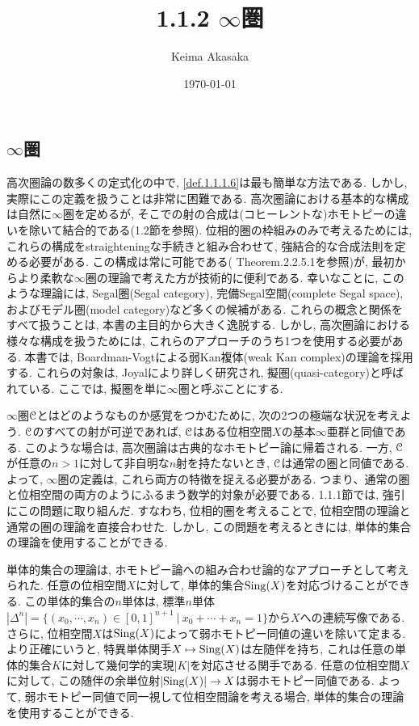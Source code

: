 \documentclass[uplatex, a4paper, 14Q, dvipdfmx]{jsreport}
\title{1.1.2 \texorpdfstring{$\infty$}{infty}圏}
\author{Keima Akasaka}
\date{\today}
\begin{document}
\maketitle

\setcounter{chapter}{1}
\setcounter{section}{1} 
\setcounter{subsection}{1}   
\setcounter{subsubsection}{1}

\subsection{\texorpdfstring{$\infty$}{infty}圏}

高次圏論の数多くの定式化の中で, \cref{def.1.1.1.6}は最も簡単な方法である. 
しかし, 実際にこの定義を扱うことは非常に困難である. 
高次圏論における基本的な構成は自然に$\infty$圏を定めるが, そこでの射の合成は(コヒーレントな)ホモトピーの違いを除いて結合的である(1.2節を参照).
位相的圏の枠組みのみで考えるためには, これらの構成をstraighteningな手続きと組み合わせて, 強結合的な合成法則を定める必要がある. 
この構成は常に可能である(\cite{HTT} Theorem.2.2.5.1を参照)が, 最初からより柔軟な$\infty$圏の理論で考えた方が技術的に便利である. 
幸いなことに, このような理論には, Segal圏(Segal category), 完備Segal空間(complete Segal space), およびモデル圏(model category)など多くの候補がある. 
これらの概念と関係をすべて扱うことは, 本書の主目的から大きく逸脱する. 
しかし, 高次圏論における様々な構成を扱うためには, これらのアプローチのうち1つを使用する必要がある. 
本書では, Boardman-Vogtによる弱Kan複体(weak Kan complex)の理論を採用する. 
これらの対象は, Joyalにより詳しく研究され, 擬圏(quasi-category)と呼ばれている. 
ここでは, 擬圏を単に$\infty$圏と呼ぶことにする. 

$\infty$圏$\mathcal{C}$とはどのようなものか感覚をつかむために, 次の2つの極端な状況を考えよう. 
$\mathcal{C}$のすべての射が可逆であれば, $\mathcal{C}$はある位相空間$X$の基本$\infty$亜群と同値である. 
このような場合は, 高次圏論は古典的なホモトピー論に帰着される. 
一方, $\mathcal{C}$が任意の$n>1$に対して非自明な$n$射を持たないとき, $\mathcal{C}$は通常の圏と同値である. 
よって, $\infty$圏の定義は, これら両方の特徴を捉える必要がある. 
つまり、通常の圏と位相空間の両方のようにふるまう数学的対象が必要である. 
1.1.1節では, 強引にこの問題に取り組んだ. 
すなわち, 位相的圏を考えることで, 位相空間の理論と通常の圏の理論を直接合わせた. 
しかし, この問題を考えるときには, 単体的集合の理論を使用することができる. 

単体的集合の理論は, ホモトピー論への組み合わせ論的なアプローチとして考えられた. 
任意の位相空間$X$に対して, 単体的集合$\mathrm{Sing}(X)$を対応づけることができる. 
この単体的集合の$n$単体は, 標準$n$単体$|\Delta^n| = \{(x_0,\cdots,x_n) \in [0,1]^{n+1} ~|~ x_0 + \cdots + x_n = 1\}$から$X$への連続写像である. 
さらに, 位相空間$X$は$\mathrm{Sing}(X)$によって弱ホモトピー同値の違いを除いて定まる. 
より正確にいうと, 特異単体関手$X \mapsto \mathrm{Sing}(X)$は左随伴を持ち, これは任意の単体的集合$K$に対して幾何学的実現$|K|$を対応させる関手である. 
任意の位相空間$X$に対して, この随伴の余単位射$|\mathrm{Sing}(X)| \to X$は弱ホモトピー同値である. 
よって, 弱ホモトピー同値で同一視して位相空間論を考える場合, 単体的集合の理論を使用することができる. 
\end{document}
